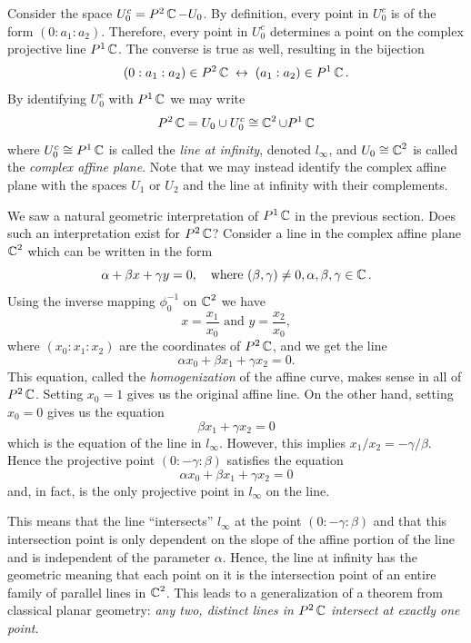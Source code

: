 Consider the space $U_0^c = P^2\operatorname{\mathbb{C}} - U_0$. By definition, every point in
$U_0^c$ is of the form $(0 : a_1 : a_2)$. Therefore, every point in
$U_0^c$ determines a point on the complex projective line $P^1\operatorname{\mathbb{C}}$. The
converse is true as well, resulting in the bijection
\[
    (0 : a_1 : a_2) \in P^2\operatorname{\mathbb{C}}
    \; \leftrightarrow \;
    (a_1 : a_2) \in P^1\operatorname{\mathbb{C}}.
\]
By identifying $U_0^c$ with $P^1\operatorname{\mathbb{C}}$ we may write
\begin{equation} \label{eqn: proejctive-plane}
  P^2\operatorname{\mathbb{C}} = U_0 \cup U_0^c \cong \operatorname{\mathbb{C}}^2 \cup P^1\operatorname{\mathbb{C}}
\end{equation}
where $U_0^c \cong P^1\operatorname{\mathbb{C}}$ is called the {\it line at infinity}, denoted
$l_\infty$, and $U_0 \cong \operatorname{\mathbb{C}}^2$ is called the {\it complex affine
  plane}. Note that we may instead identify the complex affine plane
with the spaces $U_1$ or $U_2$ and the line at infinity with their
complements.

We saw a natural geometric interpretation of $P^1\operatorname{\mathbb{C}}$ in the previous
section. Does such an interpretation exist for $P^2\operatorname{\mathbb{C}}$? Consider a line
in the complex affine plane $\operatorname{\mathbb{C}}^2$ which can be written in the form
\[
    \alpha + \beta x + \gamma y = 0,
    \quad \text{where }
    (\beta,\gamma) \neq 0, \alpha, \beta, \gamma \in \operatorname{\mathbb{C}}.
\]
Using the inverse mapping $\phi_0^{-1}$ on $\operatorname{\mathbb{C}}^2$ we have
\[
    x = \frac{x_1}{x_0} \text{ and } y = \frac{x_2}{x_0},
\]
where $(x_0 : x_1 : x_2)$ are the coordinates of $P^2\operatorname{\mathbb{C}}$, and we get
the line
\[
    \alpha x_0 + \beta x_1 + \gamma x_2 = 0.
\]
This equation, called the {\it homogenization} of the affine curve,
makes sense in all of $P^2\operatorname{\mathbb{C}}$. Setting $x_0 = 1$ gives us the original
affine line. On the other hand, setting $x_0 = 0$ gives us the equation
\[
    \beta x_1 + \gamma x_2 = 0
\]
which is the equation of the line in $l_\infty$. However, this implies
$x_1 / x_2 = - \gamma / \beta$. Hence the projective point $(0 : -\gamma
: \beta)$ satisfies the equation
\[
    \alpha x_0 + \beta x_1 + \gamma x_2 = 0
\]
and, in fact, is the only projective point in $l_\infty$ on the line.

This means that the line ``intersects'' $l_\infty$ at the point $(0 :
-\gamma : \beta)$ and that this intersection point is only dependent on
the slope of the affine portion of the line and is independent of the
parameter $\alpha$. Hence, the line at infinity has the geometric
meaning that each point on it is the intersection point of an entire
family of parallel lines in $\operatorname{\mathbb{C}}^2$. This leads to a generalization of a
theorem from classical planar geometry: {\it any two, distinct lines in
  $P^2\operatorname{\mathbb{C}}$ intersect at exactly one point}.

